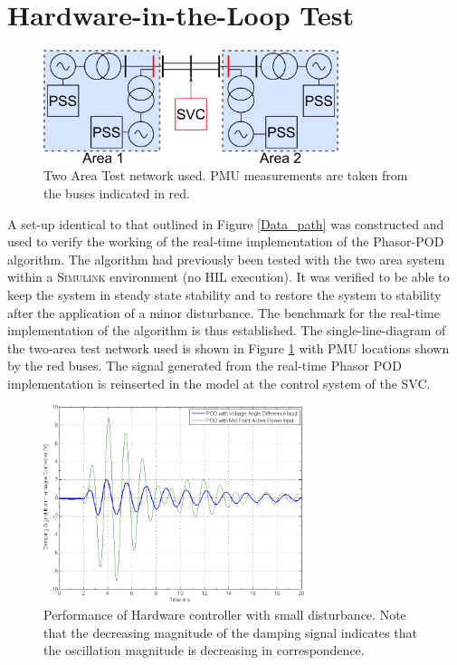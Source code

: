 \documentclass[conference]{IEEEtran}
\begin{document}
\section{Hardware-in-the-Loop Test} \label{HILtest}
\begin{figure}[H]
\centering
\includegraphics[width=3.4in]{TwoArea.png} 
\caption{Two Area Test network used. PMU measurements are taken from the buses indicated in red.}
\vspace{-0.6em}
\label{Two_area}
\end{figure}
A set-up identical to that outlined in Figure \ref{Data_path} was constructed and used to verify the working of the real-time implementation of the Phasor-POD algorithm. The algorithm had previously been tested with the two area system within a \textsc{Simulink} environment (no HIL execution). It was verified to be able to keep the system in steady state stability and to restore the system to stability after the application of a minor disturbance. The benchmark for the real-time implementation of the algorithm is thus established. The single-line-diagram of the two-area test network used is shown in Figure \ref{Two_area} with PMU locations shown by the red buses. The signal generated from the real-time Phasor POD implementation is reinserted in the model at the control system of the SVC.
\begin{figure}[htb]
\centering
\includegraphics[width=3in]{Results.png} 
\vspace{-0.6em}
\caption{Performance of Hardware controller with small disturbance. Note that the decreasing magnitude of the damping signal indicates that the oscillation magnitude is decreasing in correspondence.}
\label{Results}
\end{figure}
\end{document}
